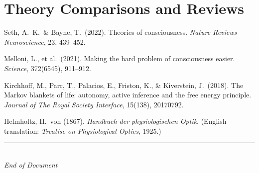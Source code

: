 \documentclass[11pt,a4paper]{report}
\begin{document}
\section*{Theory Comparisons and Reviews}
\begin{enumerate}[label={[\arabic*]}, leftmargin=2.5em, start=24]
  \item Seth, A.\ K.\ \& Bayne, T.\ (2022). Theories of consciousness. \textit{Nature Reviews Neuroscience}, 23, 439--452.
  \item Melloni, L., et al.\ (2021). Making the hard problem of consciousness easier. \textit{Science}, 372(6545), 911--912.
  \item Kirchhoff, M., Parr, T., Palacios, E., Friston, K., \& Kiverstein, J.\ (2018). The Markov blankets of life: autonomy, active inference and the free energy principle. \textit{Journal of The Royal Society Interface}, 15(138), 20170792.
  \item Helmholtz, H.\ von (1867). \textit{Handbuch der physiologischen Optik}. (English translation: \textit{Treatise on Physiological Optics}, 1925.)
\end{enumerate}

\vfill
\begin{center}
  {\color{gray}\rule{0.4\textwidth}{0.5pt}}\\[8pt]
  {\small\color{gray}\itshape End of Document}
\end{center}
\end{document}
